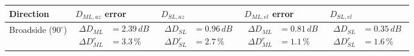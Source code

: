 \documentclass[10 pt,a4paper,twocolumn]{article}
\begin{document}
{\begin{table}[bt!]
	\begin{center}
		{\selectfont	\begin{tabular}{|m{3cm}|m{3.4cm}|m{3.4cm}|m{3.4cm}|m{3.4cm}|}
				\hline
				\rowcolor{deepsaffron}\textbf{Direction} & \textbf{$D_{ML,az}$ error} & \textbf{$D_{SL,az}$} & \textbf{$D_{ML,el}$ error} & \textbf{$D_{SL,el}$} \\
				\hline 
				Broadside ($90^\circ$) &
				
						$\begin{aligned}
							\Delta D_{ML}&=	2.39\,dB\\
							\Delta D_{ML}^r &=3.3\,\%
						\end{aligned}$ 
					
			 & 
				
						$\begin{aligned}\Delta D_{SL}&=0.96\,dB \\
						\Delta D_{SL}^r&=2.7\,\%\end{aligned}$ 

				 & $\begin{aligned}
						\Delta D_{ML}&=0.81\,dB\\
						\Delta D_{ML}^r&=1.1\,\%
					\end{aligned}$
				 & $\begin{aligned}
				 	\Delta D_{SL}&=0.35\,dB\\
				 	\Delta D_{SL}^r&=1.6\,\%	\end{aligned}$
			 \\
				\hline
				
			

\end{tabular}}
\end{center}
\end{table}}
\end{document}
